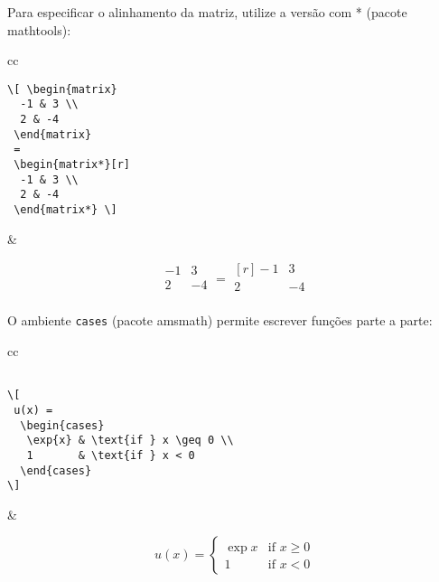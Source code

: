 \documentclass{scrartcl}
\begin{document}
Para especificar o alinhamento da matriz, utilize a versão com * (pacote \textsf{mathtools}):

\begin{center}
\begin{tabular}{cc}
\begin{minipage}{0.3\textwidth}
\begin{verbatim}
\[ \begin{matrix}
  -1 & 3 \\
  2 & -4
 \end{matrix}
 =
 \begin{matrix*}[r]
  -1 & 3 \\
  2 & -4
 \end{matrix*} \]
\end{verbatim}
\end{minipage} &
\begin{minipage}{0.4\textwidth}
\[ \begin{matrix}
  -1 & 3 \\
  2 & -4\\
 \end{matrix}
 =
 \begin{matrix*}[r]
  -1 & 3 \\
  2 & -4\\
 \end{matrix*} \]
\end{minipage}
\end{tabular} 
\end{center}

\bigskip

 O ambiente \texttt{cases} (pacote \textsf{amsmath}) permite escrever funções parte a parte:
 
 \begin{tabular}{cc}
\begin{minipage}{0.4\textwidth}
\begin{verbatim}

\[
 u(x) =
  \begin{cases}
   \exp{x} & \text{if } x \geq 0 \\
   1       & \text{if } x < 0
  \end{cases}
\]
\end{verbatim}
\end{minipage}
&
\begin{minipage}{0.4\textwidth}
\[
 u(x) =
  \begin{cases}
   \exp{x} & \text{if } x \geq 0 \\
   1       & \text{if } x < 0
  \end{cases}
\]
\end{minipage}
 \end{tabular}
 
\end{document}
